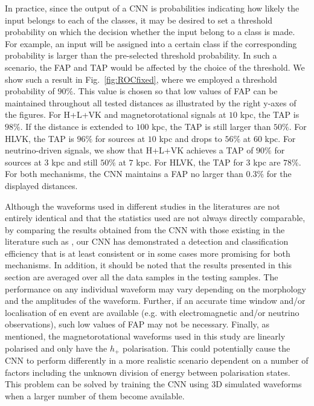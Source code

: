 \documentclass[aps,twocolumn,showpacs,groupedaddress, nofootinbib]{revtex4}  %
\begin{document}
In practice, since the output of a \ac{CNN} is probabilities indicating how
likely the input belongs to each of the classes, it may be desired to set a
threshold probability on which the decision whether the input belong to a class is made.
For example, an input will be assigned into a certain class if the
corresponding probability is larger than the pre-selected threshold probability. In such a
scenario, the \ac{FAP} and \ac{TAP} would be affected by the choice of the
threshold. We show such a result in Fig.~\ref{fig:ROCfixed}, where we employed
a threshold probability of $90\%$. 
This value is chosen so that low values of \ac{FAP} can be maintained throughout all 
tested distances
as illustrated by the right y-axes of the figures.
For H+L+VK and magnetorotational signals at $10$ kpc, the \ac{TAP} is $98\%$. 
If the distance is extended to $100$ kpc, the \ac{TAP} is still larger than $50\%$. 
For HLVK, the \ac{TAP} is $96\%$ for sources at $10$ kpc and drops to $56\%$ at
$60$ kpc.
For neutrino-driven
signals, we show that H+L+VK achieves a \ac{TAP} of $90\%$ for sources at $3$ kpc 
and still $50\%$ at $7$ kpc. 
For HLVK, the \ac{TAP} for $3$ kpc are $78\%$.
For both mechanisms, the \ac{CNN} maintains a \ac{FAP} no larger than $0.3\%$ for
the displayed distances. 


Although the waveforms used in different studies in the literatures 
are not entirely identical and that the statistics used are not always directly comparable,
by comparing the results obtained from the \ac{CNN} with those existing in the literature
such as \cite{astone2018new, gill2018enhancing, hayama2015coherent, roma2019astrophysics}, 
our \ac{CNN} has demonstrated a detection and classification efficiency that is at least consistent 
or in some cases more promising for both mechanisms.
In addition, it should be noted that the results presented in this section are
averaged over all the data samples in the testing samples. The performance on
any individual waveform may vary depending on the morphology and the amplitudes
of the waveform. 
Further, if an accurate time window and/or localisation 
of en event are available (e.g. with electromagnetic and/or neutrino observations), 
such low values of \ac{FAP} may not be necessary. 
Finally, as mentioned, the magnetorotational waveforms
used in this study are linearly polarised and only have the $h_{+}$ polarisation. 
This could potentially cause the \ac{CNN} to perform differently in a more realistic scenario 
dependent on a number of factors including the unknown division of energy between 
polarisation states.  This problem can be solved by training the \ac{CNN} 
using $3$D simulated waveforms when a larger number of them become available. 
\end{document}
